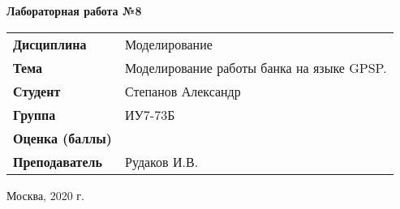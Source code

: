 \begin{center}
    \textbf{Лабораторная работа №8} \\
    \vspace{0.5cm}
\end{center}

\vspace{4cm}

\begin{flushleft}
    \begin{tabular}{ll}
        \textbf{Дисциплина} & Моделирование \\
        \textbf{Тема} & Моделирование работы банка на языке GPSP. \\
        \textbf{Студент} & Степанов Александр \\
        \textbf{Группа} & ИУ7-73Б \\
        \textbf{Оценка (баллы)} & \\
        \textbf{Преподаватель} & Рудаков И.В. \\
    \end{tabular}
\end{flushleft}

\vspace{4cm}

\begin{center}
    Москва, 2020 г.
\end{center}
